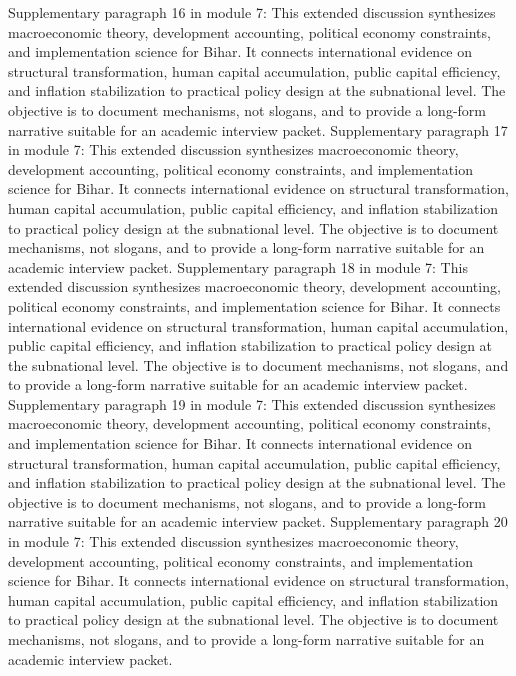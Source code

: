 \documentclass[preprint,12pt]{elsarticle}
\begin{document}
Supplementary paragraph 16 in module 7: This extended discussion synthesizes macroeconomic theory, development accounting, political economy constraints, and implementation science for Bihar. It connects international evidence on structural transformation, human capital accumulation, public capital efficiency, and inflation stabilization to practical policy design at the subnational level. The objective is to document mechanisms, not slogans, and to provide a long-form narrative suitable for an academic interview packet.
Supplementary paragraph 17 in module 7: This extended discussion synthesizes macroeconomic theory, development accounting, political economy constraints, and implementation science for Bihar. It connects international evidence on structural transformation, human capital accumulation, public capital efficiency, and inflation stabilization to practical policy design at the subnational level. The objective is to document mechanisms, not slogans, and to provide a long-form narrative suitable for an academic interview packet.
Supplementary paragraph 18 in module 7: This extended discussion synthesizes macroeconomic theory, development accounting, political economy constraints, and implementation science for Bihar. It connects international evidence on structural transformation, human capital accumulation, public capital efficiency, and inflation stabilization to practical policy design at the subnational level. The objective is to document mechanisms, not slogans, and to provide a long-form narrative suitable for an academic interview packet.
Supplementary paragraph 19 in module 7: This extended discussion synthesizes macroeconomic theory, development accounting, political economy constraints, and implementation science for Bihar. It connects international evidence on structural transformation, human capital accumulation, public capital efficiency, and inflation stabilization to practical policy design at the subnational level. The objective is to document mechanisms, not slogans, and to provide a long-form narrative suitable for an academic interview packet.
Supplementary paragraph 20 in module 7: This extended discussion synthesizes macroeconomic theory, development accounting, political economy constraints, and implementation science for Bihar. It connects international evidence on structural transformation, human capital accumulation, public capital efficiency, and inflation stabilization to practical policy design at the subnational level. The objective is to document mechanisms, not slogans, and to provide a long-form narrative suitable for an academic interview packet.
\end{document}
